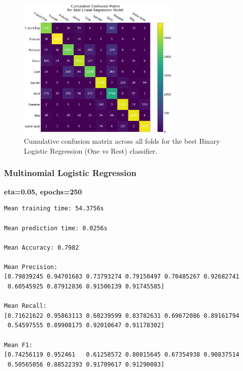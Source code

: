 \documentclass[11pt,a4paper]{article}
\begin{document}
\begin{figure}[H]
    \centering
    \includegraphics[width=0.7\textwidth]{img/conf_mat_lr.png}
    \caption{Cumulative confusion matrix across all folds for the best Binary Logistic Regression (One vs Rest) classifier.}
    \label{fig:conf_mat_lr}
\end{figure}

\pagebreak

\subsubsection*{Multinomial Logistic Regression}
\textbf{eta=0.05, epochs=250}
\begin{verbatim}
Mean training time: 54.3756s

Mean prediction time: 0.0256s

Mean Accuracy: 0.7982

Mean Precision:
[0.79839245 0.94701683 0.73793274 0.79150497 0.70485267 0.92682741
 0.60545925 0.87912836 0.91506139 0.91745585]

Mean Recall:
[0.71621622 0.95863113 0.60239599 0.83782631 0.69672086 0.89161794
 0.54597555 0.89908175 0.92010647 0.91178302]

Mean F1:
[0.74256119 0.952461   0.61258572 0.80815645 0.67354938 0.90837514
 0.50565056 0.88522393 0.91709617 0.91290083]
\end{verbatim}
\end{document}
